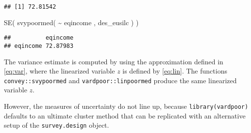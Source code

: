 \documentclass[
]{book}
\newenvironment{Shaded}{\begin{snugshade}}{\end{snugshade}}
\newcommand{\FunctionTok}[1]{\textcolor[rgb]{0.00,0.00,0.00}{#1}}
\newcommand{\NormalTok}[1]{#1}
\newcommand{\SpecialCharTok}[1]{\textcolor[rgb]{0.00,0.00,0.00}{#1}}
\begin{document}
\begin{verbatim}
## [1] 72.81542
\end{verbatim}

\begin{Shaded}
\begin{Highlighting}[]
\FunctionTok{SE}\NormalTok{( }\FunctionTok{svypoormed}\NormalTok{( }\SpecialCharTok{\textasciitilde{}}\NormalTok{ eqincome , des\_eusilc ) )}
\end{Highlighting}
\end{Shaded}

\begin{verbatim}
##          eqincome
## eqincome 72.87983
\end{verbatim}

The variance estimate is computed by using the approximation defined in \eqref{eq:var}, where the linearized variable \(z\) is defined by \eqref{eq:lin}. The functions \texttt{convey::svypoormed} and \texttt{vardpoor::linpoormed} produce the same linearized variable \(z\).

However, the measures of uncertainty do not line up, because \texttt{library(vardpoor)} defaults to an ultimate cluster method that can be replicated with an alternative setup of the \texttt{survey.design} object.
\end{document}
